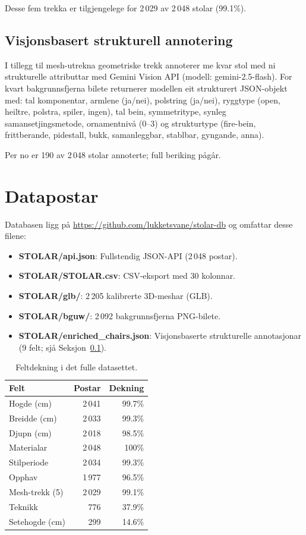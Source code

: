 Desse fem trekka er tilgjengelege for 2\,029 av 2\,048 stolar (99.1\%).

\subsection{Visjonsbasert strukturell annotering}
\label{sec:enrichment}

I tillegg til mesh-utrekna geometriske trekk
annoterer me kvar stol med ni strukturelle attributtar
med Gemini Vision API (modell: gemini-2.5-flash).
For kvart bakgrunnsfjerna bilete returnerer modellen eit strukturert JSON-objekt
med: tal komponentar, armlene (ja/nei), polstring (ja/nei),
ryggtype (open, heiltre, polstra, spiler, ingen),
tal bein, symmetritype, synleg samansetjingsmetode,
ornamentniv\aa{} (0--3) og strukturtype
(fire-bein, frittberande, pidestall, bukk, samanleggbar, stablbar, gyngande, anna).

Per no er 190 av 2\,048 stolar annoterte;
full beriking p\aa g\aa r.


\section{Datapostar}

Databasen ligg p\aa{} \url{https://github.com/lukketsvane/stolar-db}
og omfattar desse filene:

\begin{itemize}
\item \textbf{STOLAR/api.json}: Fullstendig JSON-API (2\,048 postar).
\item \textbf{STOLAR/STOLAR.csv}: CSV-eksport med 30 kolonnar.
\item \textbf{STOLAR/glb/}: 2\,205 kalibrerte 3D-meshar (GLB).
\item \textbf{STOLAR/bguw/}: 2\,092 bakgrunnsfjerna PNG-bilete.
\item \textbf{STOLAR/enriched\_chairs.json}: Visjonsbaserte strukturelle annotasjonar (9 felt; sj\aa{} Seksjon~\ref{sec:enrichment}).
\end{itemize}

\begin{table}[t]
\caption{Feltdekning i det fulle datasettet.}
\label{tab:coverage}
\centering\small
\begin{tabular}{lrr}
\toprule
Felt & Postar & Dekning \\
\midrule
Hogde (cm)       & 2\,041 & 99.7\% \\
Breidde (cm)     & 2\,033 & 99.3\% \\
Djupn (cm)       & 2\,018 & 98.5\% \\
Materialar       & 2\,048 & 100\% \\
Stilperiode      & 2\,034 & 99.3\% \\
Opphav           & 1\,977 & 96.5\% \\
Mesh-trekk (5)   & 2\,029 & 99.1\% \\
Teknikk          & 776    & 37.9\% \\
Setehogde (cm)   & 299    & 14.6\% \\
\bottomrule
\end{tabular}
\end{table}

